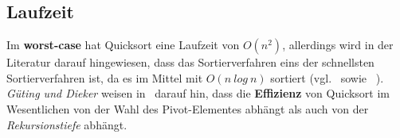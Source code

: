 \subsection{Laufzeit}
Im \textbf{worst-case} hat Quicksort eine Laufzeit von $O(n^2)$, allerdings wird in der Literatur darauf hingewiesen, dass das Sortierverfahren eins der schnellsten Sortierverfahren ist, da es im Mittel mit $O(n\ log\ n)$ sortiert (vgl.~\cite[92]{OW17b} sowie ~\cite[173]{GD18e}).\\
\textit{Güting und Dieker} weisen in~\cite[182 f.]{GD18e} darauf hin, dass die \textbf{Effizienz} von Quicksort im Wesentlichen von der Wahl des Pivot-Elementes abhängt als auch von der \textit{Rekursionstiefe} abhängt.